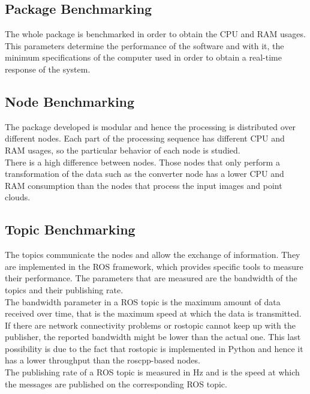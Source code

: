 \subsection{Package Benchmarking}
The whole package is benchmarked in order to obtain the CPU and RAM usages. This parameters determine the performance of the software and with it, the minimum specifications of the computer used in order to obtain a real-time response of the system.  \\[0.5cm]

\subsection{Node Benchmarking}
The package developed is modular and hence the processing is distributed over different nodes. Each part of the processing sequence has different CPU and RAM usages, so the particular behavior of each node is studied. 
\\

There is a high difference between nodes. Those nodes that only perform a transformation of the data such as the converter node has a lower CPU and RAM consumption than the nodes that process the input images and point clouds. \\[0.5cm]

\subsection{Topic Benchmarking}
The topics communicate the nodes and allow the exchange of information. They are implemented in the ROS framework, which provides specific tools to measure their performance.
The parameters that are measured are the bandwidth of the topics and their publishing rate.\\

The bandwidth parameter in a ROS topic is the maximum amount of data received over time, that is the maximum speed at which the data is transmitted. If there are network connectivity problems or rostopic cannot keep up with the publisher, the reported bandwidth might be lower than the actual one. This last possibility is due to the fact that rostopic is implemented in Python and hence it has a lower throughput than the roscpp-based nodes. \\

The publishing rate of a ROS topic is measured in Hz and is the speed at which the messages are published on the corresponding ROS topic. 


\newpage

